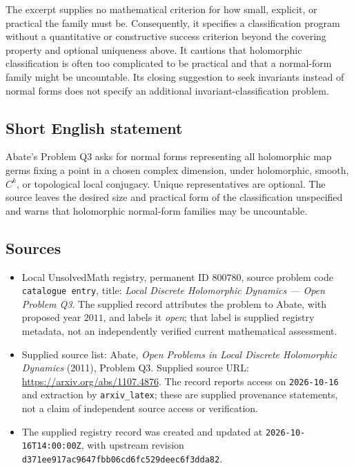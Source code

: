 \documentclass[11pt]{article}
\begin{document}
The excerpt supplies no mathematical criterion for how small, explicit, or practical the family must be. Consequently, it specifies a classification program without a quantitative or constructive success criterion beyond the covering property and optional uniqueness above. It cautions that holomorphic classification is often too complicated to be practical and that a normal-form family might be uncountable. Its closing suggestion to seek invariants instead of normal forms does not specify an additional invariant-classification problem.
\subsection{Short English statement}
Abate's Problem Q3 asks for normal forms representing all holomorphic map germs fixing a point in a chosen complex dimension, under holomorphic, smooth, \(C^k\), or topological local conjugacy. Unique representatives are optional. The source leaves the desired size and practical form of the classification unspecified and warns that holomorphic normal-form families may be uncountable.
\subsection{Sources}
\begin{itemize}
\item Local UnsolvedMath registry, permanent ID \(800780\), source problem code \texttt{catalogue entry}, title: \emph{Local Discrete Holomorphic Dynamics --- Open Problem Q3}. The supplied record attributes the problem to Abate, with proposed year \(2011\), and labels it \emph{open}; that label is supplied registry metadata, not an independently verified current mathematical assessment.
\item Supplied source list: Abate, \emph{Open Problems in Local Discrete Holomorphic Dynamics} (2011), Problem Q3. Supplied source URL: \url{https://arxiv.org/abs/1107.4876}. The record reports access on \texttt{2026-10-16} and extraction by \texttt{arxiv\_latex}; these are supplied provenance statements, not a claim of independent source access or verification.
\item The supplied registry record was created and updated at \texttt{2026-10-16T14:00:00Z}, with upstream revision \texttt{d371ee917ac9647fbb06cd6fc529deec6f3dda82}.
\end{itemize}
\end{document}
